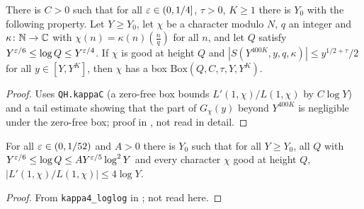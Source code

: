 \begin{lemma}\label{host:box-of-s}
There is $C>0$ such that for all $\varepsilon\in(0,1/4]$, $\tau>0$, $K\ge1$ there
is $Y_0$ with the following property. Let $Y\ge Y_0$, let $\chi$ be a
character modulo $N$, $q$ an integer and $\kappa\colon\mathbb{N}\to\mathbb{C}$ with
$\chi(n)=\kappa(n)\left(\frac nq\right)$ for all $n$, and let $Q$ satisfy
$Y^{\varepsilon/6}\le\log Q\le Y^{\varepsilon/4}$. If $\chi$ is good at height $Q$ and
$|S(Y^{400K},y,q,\kappa)|\le y^{1/2+\tau}/2$ for all $y\in[Y,Y^K]$, then
$\chi$ has a box $\mathrm{Box}(Q,C,\tau,Y,Y^K)$.
\end{lemma}
\begin{proof}
Uses \texttt{QH.kappaC} (a zero-free box bounds $L'(1,\chi)/L(1,\chi)$ by
$C\log Y$) and a tail estimate showing that the part of $G_{\chi}(y)$ beyond
$Y^{400K}$ is negligible under the zero-free box; proof in
, not
read in detail.
\end{proof}

\begin{lemma}\label{host:kappa4}
For all $\varepsilon\in(0,1/52)$ and $A>0$ there is $Y_0$ such that for all
$Y\ge Y_0$, all $Q$ with $Y^{\varepsilon/6}\le\log Q\le AY^{\varepsilon/5}\log^2Y$ and
every character $\chi$ good at height $Q$,
$|L'(1,\chi)/L(1,\chi)|\le4\log Y$.
\end{lemma}
\begin{proof}
From \texttt{kappa4\_loglog} in
;
not read here.
\end{proof}

